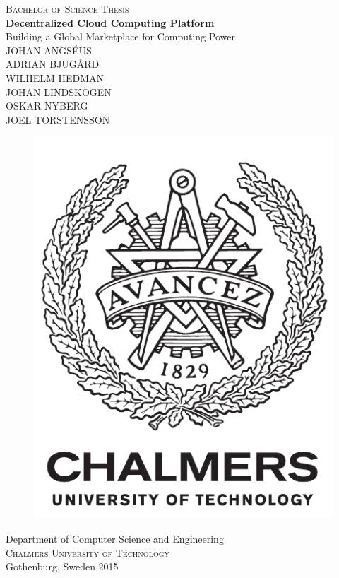 \newpage
\restoregeometry
\thispagestyle{empty}
\mbox{}


\newpage
\thispagestyle{empty}
\begin{center}
	\textsc{\large Bachelor of Science Thesis}\\[4cm]
	\textbf{\large Decentralized Cloud Computing Platform} \\[1cm]
	{\large Building a Global Marketplace for Computing Power}\\[1cm]
	{\large JOHAN ANGSÉUS\\
	        ADRIAN BJUGÅRD\\
	        WILHELM HEDMAN\\
	        JOHAN LINDSKOGEN\\
	        OSKAR NYBERG\\
	        JOEL TORSTENSSON\\}
	
	\vfill	
	\begin{figure}[h!]
	\centering
	\includegraphics[width=0.2\pdfpagewidth]{figure/auxiliary/logo_eng.pdf} \\	
	\end{figure}	\vspace{5mm}	
	
	Department of Computer Science and Engineering \\
	\textsc{Chalmers University of Technology} \\
	Gothenburg, Sweden 2015 \\
\end{center}


